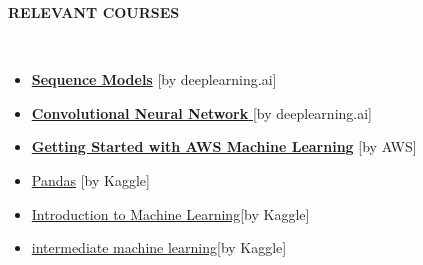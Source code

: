 \documentclass[a4paper,10pt]{article}
\newcommand{\lsep}{-0.5cm}
\newcommand{\resheading}[1]{{\small \colorbox{mygrey}{\begin{minipage}{0.975\textwidth}{\textbf{#1 \vphantom{p\^{E}}}}\end{minipage}}}}
\begin{document}
\resheading{\textbf{RELEVANT COURSES} }\\[\lsep]
\begin{itemize}
\setlength\itemsep{0em}

\item \href{https://coursera.org/share/494211b74044bb124bcd4dd525ebe527}{\textbf{Sequence Models}} [by deeplearning.ai]

\item \href{https://coursera.org/share/4eef4515a4c9099a507fe088d7689d24}{\textbf{Convolutional Neural Network }} [by deeplearning.ai]

\item \href{https://coursera.org/share/6d84b47abf454cc3b3c30f170e335449}{\textbf{Getting Started with AWS Machine Learning}} [by AWS]





\item \href{https://www.kaggle.com/learn/certification/soumitra2060/pandas}{Pandas} [by Kaggle]

\item \href{https://www.kaggle.com/learn/certification/soumitra2060/intro-to-machine-learning}{Introduction to Machine Learning}[by Kaggle]

\item \href{https://www.kaggle.com/learn/certification/soumitra2060/intermediate-machine-learning}{intermediate machine learning}[by Kaggle]


\end{itemize}
\end{document}
